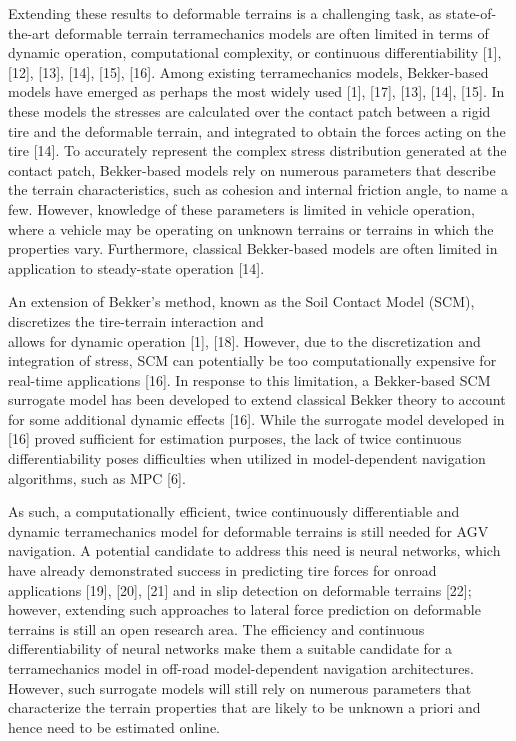 \documentclass[10pt]{article}
\begin{document}
Extending these results to deformable terrains is a challenging task, as state-of-the-art deformable terrain terramechanics models are often limited in terms of dynamic operation, computational complexity, or continuous differentiability [1], [12], [13], [14], [15], [16]. Among existing terramechanics models, Bekker-based models have emerged as perhaps the most widely used [1], [17], [13], [14], [15]. In these models the stresses are calculated over the contact patch between a rigid tire and the deformable terrain, and integrated to obtain the forces acting on the tire [14]. To accurately represent the complex stress distribution generated at the contact patch, Bekker-based models rely on numerous parameters that describe the terrain characteristics, such as cohesion and internal friction angle, to name a few. However, knowledge of these parameters is limited in vehicle operation, where a vehicle may be operating on unknown terrains or terrains in which the properties vary. Furthermore, classical Bekker-based models are often limited in application to steady-state operation [14].

An extension of Bekker's method, known as the Soil Contact Model (SCM), discretizes the tire-terrain interaction and\\[0pt]
allows for dynamic operation [1], [18]. However, due to the discretization and integration of stress, SCM can potentially be too computationally expensive for real-time applications [16]. In response to this limitation, a Bekker-based SCM surrogate model has been developed to extend classical Bekker theory to account for some additional dynamic effects [16]. While the surrogate model developed in [16] proved sufficient for estimation purposes, the lack of twice continuous differentiability poses difficulties when utilized in model-dependent navigation algorithms, such as MPC [6].

As such, a computationally efficient, twice continuously differentiable and dynamic terramechanics model for deformable terrains is still needed for AGV navigation. A potential candidate to address this need is neural networks, which have already demonstrated success in predicting tire forces for onroad applications [19], [20], [21] and in slip detection on deformable terrains [22]; however, extending such approaches to lateral force prediction on deformable terrains is still an open research area. The efficiency and continuous differentiability of neural networks make them a suitable candidate for a terramechanics model in off-road model-dependent navigation architectures. However, such surrogate models will still rely on numerous parameters that characterize the terrain properties that are likely to be unknown a priori and hence need to be estimated online.
\end{document}
